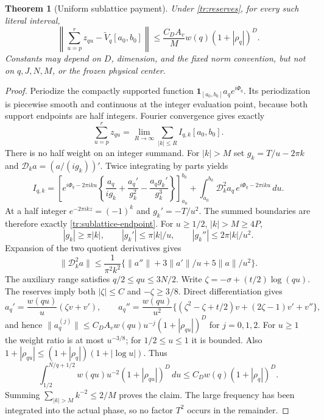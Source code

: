 \documentclass[11pt]{article}
\numberwithin{equation}{section}
\newtheorem{theorem}{Theorem}[section]
\theoremstyle{definition}
\theoremstyle{remark}
\begin{document}
\begin{theorem}[Uniform sublattice payment]
\label{tr:sublattice-error}
Under \eqref{tr:reserves}, for every such literal interval,
\[
 \left\|\sum_{u=p}^rz_{qu}-\widetilde V_q[a_0,b_0]\right\|
 \le \frac{C_DA_v}{M}w(q)(1+|\rho_q|)^D.
\]
Constants may depend on $D$, dimension, and the fixed norm convention,
but not on $q,J,N,M$, or the frozen physical center.
\end{theorem}
\begin{proof}
Periodize the compactly supported function
$\mathbf1_{[a_0,b_0]}a_qe^{i\Phi_q}$.  Its periodization is piecewise
smooth and continuous at the integer evaluation point, because both
support endpoints are half integers.  Fourier convergence gives exactly
\[
 \sum_{u=p}^rz_{qu}=\lim_{R\to\infty}
                       \sum_{|k|\le R}I_{q,k}[a_0,b_0].
\]
There is no half weight on an integer summand.
For $|k|>M$ set $g_k=T/u-2\pi k$ and
$\mathcal D_k a=(a/(ig_k))'$.  Twice integrating by parts yields
\[
 I_{q,k}=\left[e^{i\Phi_q-2\pi iku}
 \left\{\frac{a_q}{ig_k}+\frac{a_q'}{g_k^2}
                   -\frac{a_qg_k'}{g_k^3}\right\}\right]_{a_0}^{b_0}
 +\int_{a_0}^{b_0}\mathcal D_k^2a_q\,
                   e^{i\Phi_q-2\pi iku}\,du.
\]
At a half integer $e^{-2\pi ikz}=(-1)^k$ and $g_k'=-T/u^2$.
The summed boundaries are therefore exactly
\eqref{tr:sublattice-endpoint}.  For $u\ge1/2$, $|k|>M\ge4P$,
\[
 |g_k|\ge\pi|k|,\qquad |g_k'|\le\pi|k|/u,
 \qquad |g_k''|\le2\pi|k|/u^2.
\]
Expansion of the two quotient derivatives gives
\[
 \|\mathcal D_k^2a\|
 \le\frac1{\pi^2k^2}
       \{\|a''\|+3\|a'\|/u+5\|a\|/u^2\}.
\]
The auxiliary range satisfies $q/2\le qu\le3N/2$.
Write $\zeta=-\sigma+(t/2)\log(qu)$.  The reserves imply both
$|\zeta|\le C$ and $-\zeta\ge3/8$.  Direct differentiation gives
\[
 a_q'=\frac{w(qu)}u(\zeta v+v'),\qquad
 a_q''=\frac{w(qu)}{u^2}
 \{(\zeta^2-\zeta+t/2)v+(2\zeta-1)v'+v''\},
\]
and hence
$\|a_q^{(j)}\|\le C_DA_vw(qu)u^{-j}(1+|\rho_{qu}|)^D$ for
$j=0,1,2$.  For $u\ge1$ the weight ratio is at most $u^{-3/8}$;
for $1/2\le u\le1$ it is bounded.  Also
$1+|\rho_{qu}|\le(1+|\rho_q|)(1+|\log u|)$.  Thus
\[
 \int_{1/2}^{N/q+1/2}w(qu)u^{-2}(1+|\rho_{qu}|)^D\,du
 \le C_Dw(q)(1+|\rho_q|)^D.
\]
Summing $\sum_{|k|>M}k^{-2}\le2/M$ proves the claim.  The large
frequency has been integrated into the actual phase, so no factor $T^2$
occurs in the remainder.
\end{proof}
\end{document}
